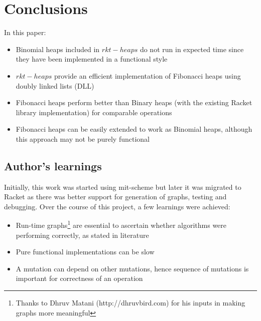 \documentclass{llncs}
\begin{document}
\section{Conclusions}
In this paper:
\begin{itemize}
	\item Binomial heaps included in $rkt-heaps$ do not run in expected time since they have been implemented in a functional style
	\item $rkt-heaps$ provide an efficient implementation of Fibonacci heaps using doubly linked lists (DLL)
	\item Fibonacci heaps perform better than Binary heaps (with the existing Racket library implementation) for comparable operations
	\item Fibonacci heaps can be easily extended to work as Binomial heaps, although this approach may not be purely functional
\end{itemize}

\subsection{Author's learnings}
Initially, this work was started using mit-scheme but later it was migrated to Racket as there was better support for generation of graphs, testing and debugging. Over the course of this project, a few learnings were achieved:
\begin{itemize}
	\item Run-time graphs\footnote{Thanks to Dhruv Matani (http://dhruvbird.com) for his inputs in making graphs more meaningful} are essential to ascertain whether algorithms were performing correctly, as stated in literature
	\item Pure functional implementations can be slow 
    \item A mutation can depend on other mutations, hence sequence of mutations is important for correctness of an operation
\end{itemize}
		




\newpage
\appendix


\newpage
\end{document}
